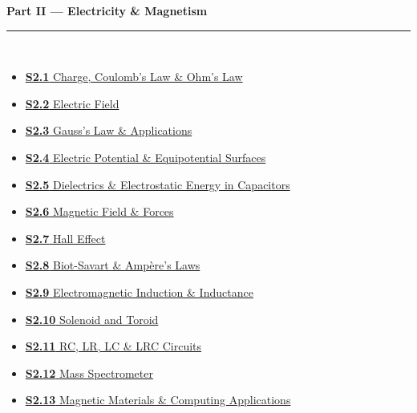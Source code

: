 \documentclass[12pt,a3paper]{article}
\begin{document}
\begin{tcolorbox}[colback=cB!5,colframe=cB,boxrule=1pt,arc=5pt,
  left=8pt,right=8pt,top=8pt,bottom=8pt,before skip=4pt]
  {\large\bfseries\textcolor{cB}{Part II --- Electricity \& Magnetism}}\\[5pt]
  \textcolor{cB!40}{\rule{\textwidth}{0.4pt}}\\[3pt]
  \small\begin{itemize}[leftmargin=1.2em,itemsep=1pt,label={\textcolor{cB}{$\triangleright$}}]
    \item \hyperref[sec:s21]{\textbf{S2.1} Charge, Coulomb's Law \& Ohm's Law}
    \item \hyperref[sec:s22]{\textbf{S2.2} Electric Field}
    \item \hyperref[sec:s23]{\textbf{S2.3} Gauss's Law \& Applications}
    \item \hyperref[sec:s24]{\textbf{S2.4} Electric Potential \& Equipotential Surfaces}
    \item \hyperref[sec:s25]{\textbf{S2.5} Dielectrics \& Electrostatic Energy in Capacitors}
    \item \hyperref[sec:s26]{\textbf{S2.6} Magnetic Field \& Forces}
    \item \hyperref[sec:s27]{\textbf{S2.7} Hall Effect}
    \item \hyperref[sec:s28]{\textbf{S2.8} Biot-Savart \& Amp\`ere's Laws}
    \item \hyperref[sec:s29]{\textbf{S2.9} Electromagnetic Induction \& Inductance}
    \item \hyperref[sec:s210]{\textbf{S2.10} Solenoid and Toroid}
    \item \hyperref[sec:s211]{\textbf{S2.11} RC, LR, LC \& LRC Circuits}
    \item \hyperref[sec:s212]{\textbf{S2.12} Mass Spectrometer}
    \item \hyperref[sec:s213]{\textbf{S2.13} Magnetic Materials \& Computing Applications}
  \end{itemize}
\end{tcolorbox}
\end{document}
